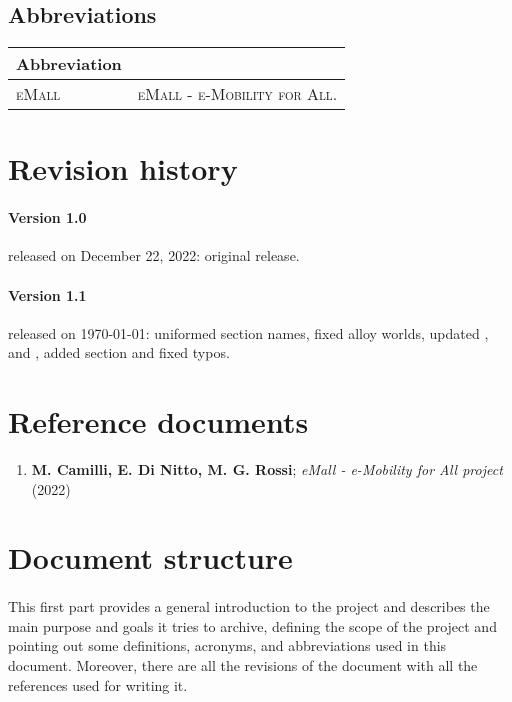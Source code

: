 \subsection{Abbreviations}

\begin{center}
    \begin{tabular}{ | >{\centering\arraybackslash}m{} | >{\arraybackslash}m{} | }
        \hline
        \textbf{Abbreviation} & \multicolumn{1}{c|}{\textbf{Description}} \\
        \hline
        \hline
        \textsc{eMall} & \textsc{eMall - e-Mobility for All}. \\
        \hline
    \end{tabular}
\end{center}

\section{Revision history}

\paragraph{Version 1.0} released on December 22, 2022: original release.
\paragraph{Version 1.1} released on \today: uniformed section names, fixed alloy worlds, updated ,  and , added  section and fixed typos.

\section{Reference documents}

\begin{enumerate}
    \item \textbf{M. Camilli, E. Di Nitto, M. G. Rossi}; \textit{eMall - e-Mobility for All project} (2022)
\end{enumerate}

\pagebreak

\section{Document structure}

\paragraph{} This first part provides a general introduction to the project and describes the main purpose and goals it tries to archive, defining the scope of the project and pointing out some definitions, acronyms, and abbreviations used in this document. Moreover, there are all the revisions of the document with all the references used for writing it.


